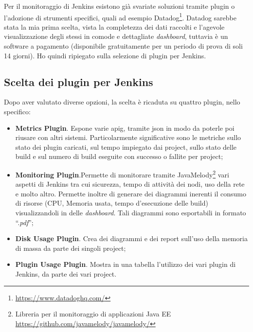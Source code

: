 Per il monitoraggio di Jenkins esistono già svariate soluzioni tramite \gls{plugin} o l'adozione di strumenti specifici, quali ad esempio Datadog\footnote{\url{https://www.datadoghq.com/}}. Datadog sarebbe stata la mia prima scelta, vista la completezza dei dati raccolti e l'agevole visualizzazione degli stessi in comode e dettagliate \textit{dashboard}, tuttavia è un software a pagamento (disponibile gratuitamente per un periodo di prova di soli 14 giorni). Ho quindi ripiegato sulla selezione di \gls{plugin} per Jenkins.

\subsection{Scelta dei plugin per Jenkins}
\label{subsec:scelta-plugin}

Dopo aver valutato diverse opzioni, la scelta è ricaduta su quattro \gls{plugin}, nello specifico:

\begin{itemize}
    \item \textbf{Metrics Plugin\cite{site:metrics-plugin}}. Espone varie \gls{apig}, tramite \gls{json} in modo da poterle poi riusare
    con altri sistemi. Particolarmente significative sono le metriche sullo stato dei \gls{plugin}
    caricati, sul tempo impiegato dai \gls{project}, sullo stato delle \gls{build} e sul numero di build eseguite con successo o fallite per project;
    \item \textbf{Monitoring Plugin\cite{site:monitoring-plugin}}.Permette di monitorare tramite
    JavaMelody\footnote{Libreria per il monitoraggio di applicazioni \gls{Java EE} \url{https://github.com/javamelody/javamelody/}} vari aspetti di Jenkins tra cui
    sicurezza, tempo di attività dei nodi, uso della rete e molto altro. Permette inoltre di generare dei diagrammi inerenti il consumo di risorse (CPU, Memoria usata, tempo d'esecuzione delle build) visualizzandoli in delle \textit{dashboard}. Tali diagrammi sono esportabili in formato ``.\textit{pdf}'';
    \item \textbf{Disk Usage Plugin\cite{site:disk-usage-plugin}}. Crea dei diagrammi e dei report sull'uso della memoria di massa da parte dei singoli \gls{project};
    \item \textbf{Plugin Usage Plugin\cite{site:plugin-usage-plugin}}. Mostra in una tabella l'utilizzo dei vari \gls{plugin} di Jenkins, da parte dei vari \gls{project}.
\end{itemize}


